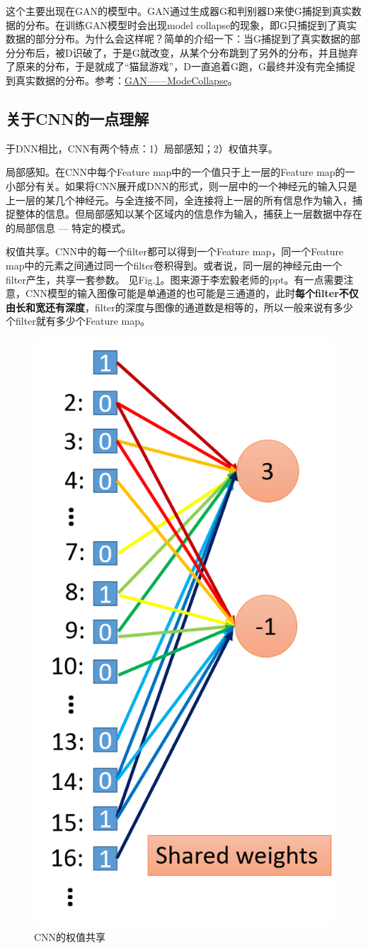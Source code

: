 这个主要出现在GAN的模型中。GAN通过生成器G和判别器D来使G捕捉到真实数据的分布。在训练GAN模型时会出现model collapse的现象，即G只捕捉到了真实数据的部分分布。为什么会这样呢？简单的介绍一下：当G捕捉到了真实数据的部分分布后，被D识破了，于是G就改变，从某个分布跳到了另外的分布，并且抛弃了原来的分布，于是就成了“猫鼠游戏”，D一直追着G跑，G最终并没有完全捕捉到真实数据的分布。参考：\href{https://blog.csdn.net/SPARKKKK/article/details/72598041}{GAN——ModeCollapse}。


\subsection{关于CNN的一点理解}
于DNN相比，CNN有两个特点：1）局部感知；2）权值共享。

局部感知。在CNN中每个Feature map中的一个值只于上一层的Feature map的一小部分有关。如果将CNN展开成DNN的形式，则一层中的一个神经元的输入只是上一层的某几个神经元。与全连接不同，全连接将上一层的所有信息作为输入，捕捉整体的信息。但局部感知以某个区域内的信息作为输入，捕获上一层数据中存在的局部信息 --- 特定的模式。

权值共享。CNN中的每一个filter都可以得到一个Feature map，同一个Feature map中的元素之间通过同一个filter卷积得到。或者说，同一层的神经元由一个filter产生，共享一套参数。
见Fig.\ref{fig:share_weight}。图来源于李宏毅老师的ppt。有一点需要注意，CNN模型的输入图像可能是单通道的也可能是三通道的，此时\textbf{每个filter不仅由长和宽还有深度}，filter的深度与图像的通道数是相等的，所以一般来说有多少个filter就有多少个Feature map。

\begin{figure}[h]
	\centering
	\includegraphics[width=.3\textwidth]{pics/share_weight.png}
	\caption{CNN的权值共享}
	\label{fig:share_weight}
\end{figure}

